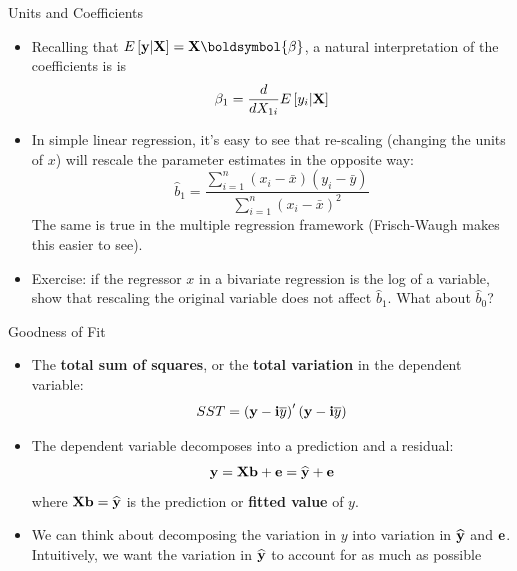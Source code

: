 \documentclass[aspectratio=169,11pt]{beamer}
\begin{document}
\begin{frame}{Units and Coefficients}
\begin{itemize}
	\item Recalling that $E\left[{\bf y}|{\bf X}\right] = {\bf X} \boldsymbol{\beta}$, a natural interpretation	of
	the coefficients is 
	is \[
	\beta_1 = \frac{d }{d X_{1i}}E\left[y_i |{\bf X}\right]
	\]
	
	\item In simple linear regression, it's easy to see that re-scaling (changing the units
	of $x$) will rescale the parameter estimates in the opposite way:\[
		\hat{b}_1 =\frac{\sum\limits_{i=1}^n(x_i-\bar{x})(y_i-\bar{y})}{\sum\limits_{i=1}^n(x_i-\bar{x})^2}
	\]
 	The same is true in the multiple regression framework (Frisch-Waugh makes this easier to see). 

	\medskip
	\item Exercise: if the regressor $x$ in a bivariate regression
	is the log of a variable, show that rescaling the original variable does not
	affect $\hat{b}_1 $. What about $\hat{b}_0$? 
\end{itemize}
\end{frame}




\begin{frame}{Goodness of Fit}
\begin{itemize}
	\item The {\bf total sum of squares}, or the {\bf total variation} in the dependent variable:\[
	SST = \left({\bf y} - {\bf i} \overline{y} \right)' \left({\bf y} - {\bf i} \overline{y} \right)
	\]

	\smallskip
	\item The dependent variable decomposes into a prediction and a residual:\[
	{\bf y} = {\bf X} {\bf b} + {\bf e} =  \widehat{{\bf y}} + {\bf e}
	\]
where ${\bf X} {\bf b} =  \widehat{{\bf y}}$ is the prediction or {\bf fitted value} of $y$. 

	\smallskip
	\item We can think about decomposing the variation in $y$ into variation in $ \widehat{{\bf y}}$ and ${\bf e}$.
	Intuitively, we want the variation in  $ \widehat{{\bf y}}$ to account for as much as possible
\end{itemize}
\end{frame}
\end{document}
